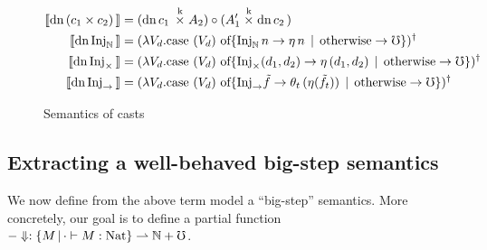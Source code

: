 \begin{figure*}
\begin{minipage}{0.3\textwidth}
\begin{footnotesize}
\begin{align*}
    \llbracket {\text{dn}\,{(c_1 \times c_2)}\,} \rrbracket &= (\text{dn}\,{c_1}\, \mathrel{\mathop{\times}\limits^{\textrm{k}}} A_2) \circ (A_1' \mathrel{\mathop{\times}\limits^{\textrm{k}}} \text{dn}\,{c_2}\,) \\
    \llbracket {\text{dn}\,{\text{Inj}_\mathbb{N}}\,} \rrbracket &= (
      \lambda V_d . \text{case $({V_d})$ of}
      \{ \text{Inj}_\mathbb{N}\,n \to \eta\, n
         \mathrel{\bf \,\mid\,} \text{otherwise} \to \mho \})^\dagger \\
    \llbracket {\text{dn}\,{\text{Inj}_\times}\,} \rrbracket &= (
      \lambda V_d . \text{case $({V_d})$ of}
      \{ \text{Inj}_\times(d_1, d_2) \to \eta\, (d_1, d_2)
         \mathrel{\bf \,\mid\,} \text{otherwise} \to \mho \})^\dagger \\
    \llbracket {\text{dn}\,{\text{Inj}_\to}\,} \rrbracket &= (
      \lambda V_d . \text{case $({V_d})$ of}
      \{ \text{Inj}_\to \tilde{f} \to \theta_t\, (\eta (\tilde{f}_t))
         \mathrel{\bf \,\mid\,} \text{otherwise} \to \mho \})^\dagger \\
  \end{align*}
    \end{footnotesize}
  \end{minipage}
  \caption{Semantics of casts}
  \label{fig:term-semantics}
\end{figure*}

\subsection{Extracting a well-behaved big-step semantics}\label{sec:big-step-term-semantics}


We now define from the above term model a ``big-step'' semantics. More
concretely, our goal is to define a partial function 
$-\Downarrow : \{M \,|\, \cdot \vdash M : \text{Nat} \} \rightharpoonup \mathbb{N} + {\mho}$.

